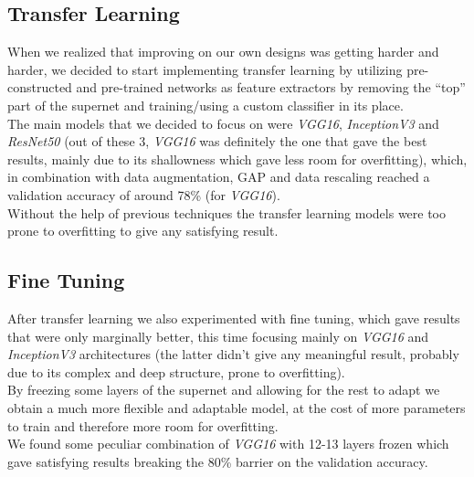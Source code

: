 \documentclass[11pt]{report}
\begin{document}
\subsection{Transfer Learning}
When we realized that improving on our own designs was getting harder and harder, we decided to start implementing transfer learning by utilizing pre-constructed and pre-trained networks as feature extractors by removing the “top” part of the supernet and training/using a custom classifier in its place. \\
The main models that we decided to focus on were \textit{VGG16}, \textit{InceptionV3} and \textit{ResNet50} (out of these 3, \textit{VGG16} was definitely the one that gave the best results, mainly due to its shallowness which gave less room for overfitting), which, in combination with data augmentation, GAP and data rescaling reached a validation accuracy of around 78\% (for \textit{VGG16}). \\
Without the help of previous techniques the transfer learning models were too prone to overfitting to give any satisfying result.

\subsection{Fine Tuning}
After transfer learning we also experimented with fine tuning, which gave results that were only marginally better, this time focusing mainly on \textit{VGG16} and \textit{InceptionV3} architectures (the latter didn’t give any meaningful result, probably due to its complex and deep structure, prone to overfitting). \\
By freezing some layers of the supernet and allowing for the rest to adapt we obtain a much more flexible and adaptable model, at the cost of more parameters to train and therefore more room for overfitting. \\
We found some peculiar combination of \textit{VGG16} with 12-13 layers frozen which gave satisfying results breaking the 80\% barrier on the validation accuracy.
\end{document}
